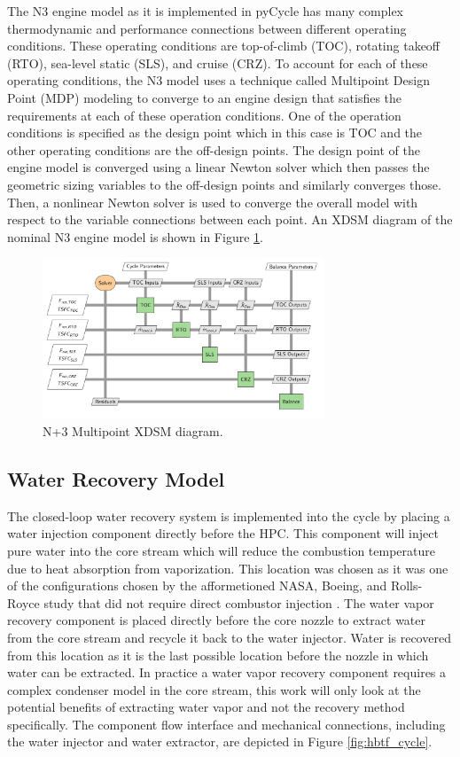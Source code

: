 \documentclass[12pt]{article}
\begin{document}
\noindent
The N3 engine model as it is implemented in pyCycle has many complex thermodynamic and performance connections between different operating conditions.
These operating conditions are top-of-climb (TOC), rotating takeoff (RTO), sea-level static (SLS), and cruise (CRZ).
To account for each of these operating conditions, the N3 model uses a technique called Multipoint Design Point (MDP) modeling to converge to an engine design that satisfies the requirements at each of these operation conditions.
One of the operation conditions is specified as the design point which in this case is TOC and the other operating conditions are the off-design points.
The design point of the engine model is converged using a linear Newton solver which then passes the geometric sizing variables to the off-design points and similarly converges those.
Then, a nonlinear Newton solver is used to converge the overall model with respect to the variable connections between each point.
An XDSM diagram of the nominal N3 engine model is shown in Figure \ref{fig:N3_xdsm}.

\begin{figure}[!hbt]
    \centering
    \includegraphics[width=0.75\textwidth]{N3_xdsm.pdf}
    \caption{N+3 Multipoint XDSM diagram.}
    \label{fig:N3_xdsm}
\end{figure}

\subsection{Water Recovery Model}
The closed-loop water recovery system is implemented into the cycle by placing a water injection component directly before the HPC.
This component will inject pure water into the core stream which will reduce the combustion temperature due to heat absorption from vaporization.
This location was chosen as it was one of the configurations chosen by the afformetioned NASA, Boeing, and Rolls-Royce study that did not require direct combustor injection \cite{nasa_inject}.
The water vapor recovery component is placed directly before the core nozzle to extract water from the core stream and recycle it back to the water injector.
Water is recovered from this location as it is the last possible location before the nozzle in which water can be extracted.
In practice a water vapor recovery component requires a complex condenser model in the core stream, this work will only look at the potential benefits of extracting water vapor and not the recovery method specifically.
The component flow interface and mechanical connections, including the water injector and water extractor, are depicted in Figure \ref{fig:hbtf_cycle}.
\end{document}
